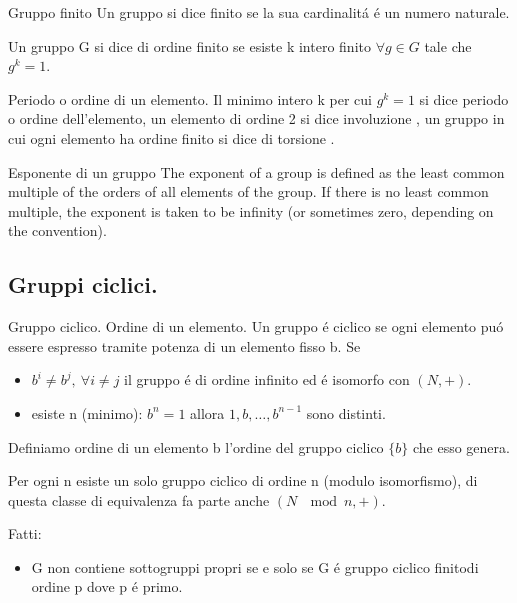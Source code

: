 \documentclass[oneside,12pt]{memoir}
\begin{document}
\begin{definition}{Gruppo finito}
 Un gruppo si dice finito se la sua cardinalit\'a \'e un numero naturale.

Un gruppo G si dice di ordine finito se esiste  k intero finito $\forall g\in G$ tale che $g^k=1$. 
\end{definition}

\begin{definition}{Periodo o ordine di un elemento.}
Il minimo intero k per cui $g^k=1$ si dice periodo o ordine dell'elemento, un elemento di ordine 2 si dice involuzione , un gruppo in cui ogni elemento ha ordine finito si dice di torsione .
\end{definition}

\begin{definition}{Esponente di un gruppo}
The exponent of a group is defined as the least common multiple of the orders of all elements of the group. If there is no least common multiple, the exponent is taken to be infinity (or sometimes zero, depending on the convention). 
\end{definition}


\subsection{Gruppi ciclici.}

\begin{definition}{Gruppo ciclico. Ordine di un elemento.}
Un gruppo \'e ciclico se ogni elemento pu\'o essere espresso tramite potenza di un elemento fisso b. Se 
\begin{itemize}
\item $b^i\neq b^j,\ \forall i\neq j$ il gruppo \'e di ordine infinito  ed \'e isomorfo con $(N,+)$.
\item esiste n (minimo): $b^n=1$ allora $1,b,\ldots,b^{n-1}$ sono distinti.
\end{itemize}

Definiamo ordine di un elemento b l'ordine del gruppo ciclico $\{b\}$ che esso genera.
\end{definition}

Per ogni n esiste un solo gruppo ciclico di ordine n (modulo isomorfismo), di questa classe di equivalenza fa parte anche $(N\ \mod{n},+)$.


Fatti:
\begin{itemize}
\item G non contiene sottogruppi propri se e solo se G \'e gruppo ciclico finitodi ordine p dove p \'e primo.
\end{itemize}
\end{document}
